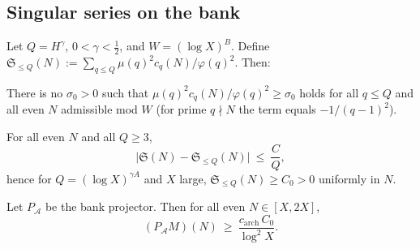 \subsection{Singular series on the bank}\label{sec:sing-series-bank}

Let $Q=H^\gamma$, $0<\gamma<\tfrac12$, and $W=(\log X)^B$.
Define $\mathfrak{S}_{\le Q}(N):=\sum_{q\le Q} \mu(q)^2 c_q(N)/\varphi(q)^2$.
Then:

\begin{lemma}\label{lem:no-go-per-arc}
There is no $\sigma_0>0$ such that $\mu(q)^2 c_q(N)/\varphi(q)^2\ge\sigma_0$ holds for all $q\le Q$ and all even $N$ admissible mod $W$ (for prime $q\nmid N$ the term equals $-1/(q-1)^2$).
\end{lemma}

\begin{proposition}\label{prop:truncation}
For all even $N$ and all $Q\ge 3$,
\[
\big|\mathfrak S(N)-\mathfrak S_{\le Q}(N)\big|\ \le\ \frac{C}{Q},
\]
hence for $Q=(\log X)^{\gamma A}$ and $X$ large,
\(
\mathfrak S_{\le Q}(N)\ge C_0>0
\)
uniformly in $N$.
\end{proposition}

\begin{corollary}\label{cor:projected-M}
Let $P_{\mathcal A}$ be the bank projector. Then for all even $N\in[X,2X]$,
\[
(P_{\mathcal A}M)(N)\ \ge\ \frac{c_{\mathrm{arch}}\,C_0}{\log^2 X}.
\]
\end{corollary}
